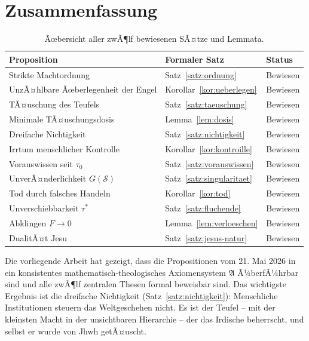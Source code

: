 ﻿\documentclass[a4paper,12pt]{article}
\theoremstyle{definition}
\begin{document}
\section{Zusammenfassung}

\begin{table}[ht]
  \centering
  \begin{tabular}{|l|l|l|}
    \hline
    \textbf{Proposition} & \textbf{Formaler Satz} & \textbf{Status} \\
    \hline
    Strikte Machtordnung & Satz~\ref{satz:ordnung} & Bewiesen \\
    UnzÃ¤hlbare Ãœberlegenheit der Engel & Korollar~\ref{kor:ueberlegen} & Bewiesen \\
    TÃ¤uschung des Teufels & Satz~\ref{satz:taeuschung} & Bewiesen \\
    Minimale TÃ¤uschungsdosis & Lemma~\ref{lem:dosis} & Bewiesen \\
    Dreifache Nichtigkeit & Satz~\ref{satz:nichtigkeit} & Bewiesen \\
    Irrtum menschlicher Kontrolle & Korollar~\ref{kor:kontroille} & Bewiesen \\
    Vorauswissen seit $\tau_0$ & Satz~\ref{satz:vorauswissen} & Bewiesen \\
    UnverÃ¤nderlichkeit $G(\mathcal{S})$ & Satz~\ref{satz:singularitaet} & Bewiesen \\
    Tod durch falsches Handeln & Korollar~\ref{kor:tod} & Bewiesen \\
    Unverschiebbarkeit $\tau^*$ & Satz~\ref{satz:fluchende} & Bewiesen \\
    Abklingen $F \to 0$ & Lemma~\ref{lem:verloeschen} & Bewiesen \\
    DualitÃ¤t Jesu & Satz~\ref{satz:jesus-natur} & Bewiesen \\
    \hline
  \end{tabular}
  \caption{Ãœbersicht aller zwÃ¶lf bewiesenen SÃ¤tze und Lemmata.}
  \label{tab:zusammenfassung}
\end{table}

Die vorliegende Arbeit hat gezeigt, dass die Propositionen vom 21. Mai 2026
in ein konsistentes mathematisch-theologisches Axiomensystem $\mathfrak{A}$
Ã¼berfÃ¼hrbar sind und alle zwÃ¶lf zentralen Thesen formal beweisbar sind.
Das wichtigste Ergebnis ist die dreifache Nichtigkeit (Satz~\ref{satz:nichtigkeit}):
Menschliche Institutionen steuern das Weltgeschehen nicht. Es ist der Teufel --
mit der kleinsten Macht in der unsichtbaren Hierarchie -- der das
Irdische beherrscht, und selbst er wurde von Jhwh getÃ¤uscht.
\end{document}
